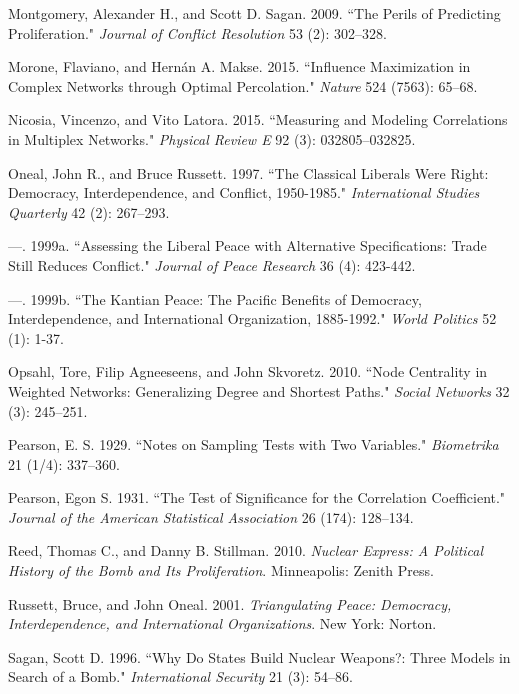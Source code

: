 \begin{thebibliography}{1\kern\bibindent}
 Montgomery, Alexander H., and Scott D. Sagan. 2009. ``The Perils of Predicting Proliferation." \textit{Journal of Conflict Resolution} 53 (2): 302--328.

 Morone, Flaviano, and Hern\'{a}n A. Makse. 2015. ``Influence Maximization in Complex Networks through Optimal Percolation." \textit{Nature} 524 (7563): 65--68.

 Nicosia, Vincenzo, and Vito Latora. 2015. ``Measuring and Modeling Correlations in Multiplex Networks." \textit{Physical Review E} 92 (3): 032805--032825.

 Oneal, John R., and Bruce Russett. 1997. ``The Classical Liberals Were Right: Democracy, Interdependence, and Conflict, 1950-1985." \textit{International Studies Quarterly} 42 (2): 267--293.

 ---. 1999a. ``Assessing the Liberal Peace with Alternative Specifications: Trade Still Reduces Conflict." \textit{Journal of Peace Research} 36 (4): 423-442.

 ---. 1999b. ``The Kantian Peace: The Pacific Benefits of Democracy, Interdependence, and International Organization, 1885-1992." \textit{World Politics} 52 (1): 1-37. 

 Opsahl, Tore, Filip Agneeseens, and John Skvoretz. 2010. ``Node Centrality in Weighted Networks: Generalizing Degree and Shortest Paths." \textit{Social Networks} 32 (3): 245--251.

 Pearson, E. S. 1929. ``Notes on Sampling Tests with Two Variables." \textit{Biometrika} 21 (1/4): 337--360.

 Pearson, Egon S. 1931. ``The Test of Significance for the Correlation Coefficient." \textit{Journal of the American Statistical Association} 26 (174): 128--134.

 Reed, Thomas C., and Danny B. Stillman. 2010. \textit{Nuclear Express: A Political History of the Bomb and Its Proliferation}. Minneapolis: Zenith Press.

 Russett, Bruce, and John Oneal. 2001. \textit{Triangulating Peace: Democracy, Interdependence, and International Organizations}. New York: Norton.

 Sagan, Scott D. 1996. ``Why Do States Build Nuclear Weapons?: Three Models in Search of a Bomb." \textit{International Security} 21 (3): 54--86.


\end{thebibliography}
